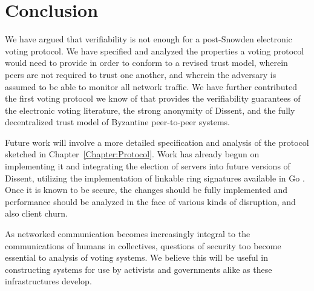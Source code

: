 \documentclass[finalcopy,nolof,nolot]{srpaper}
\begin{document}
% 

\chapter{Conclusion}\label{Chapter:Conclusion}
We have argued that verifiability is not enough for a
post-Snowden electronic voting protocol. We have specified and analyzed the
properties a voting protocol would need to provide in order to conform to a
revised trust model, wherein peers are not required to trust one another, and
wherein the adversary is assumed to be able to monitor all network traffic. We
have further contributed the first voting protocol we know of that provides the
verifiability guarantees of the electronic voting literature, the strong
anonymity of Dissent, and the fully decentralized trust model of Byzantine
peer-to-peer systems.

Future work will involve a more detailed specification and analysis of the
protocol sketched in Chapter~\ref{Chapter:Protocol}. Work has already begun on
implementing it and integrating the election of servers into future versions of
Dissent, utilizing the implementation of linkable ring signatures available in
Go \cite{golrs}. Once it is known to be secure, the changes should be fully
implemented and performance should be analyzed in the face of various kinds of
disruption, and also client churn.

As networked communication becomes increasingly integral to the communications
of humans in collectives, questions of security too become essential to analysis
of voting systems.  We believe this will be useful in constructing systems for
use by activists and governments alike as these infrastructures develop.

\listoftodos


% 
\end{document}
